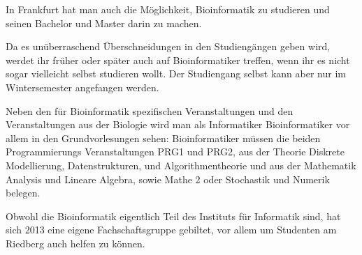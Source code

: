 In Frankfurt hat man auch die M\"oglichkeit, Bioinformatik zu studieren und seinen Bachelor und Master darin zu machen.

Da es un\"uberraschend \"Uberschneidungen in den Studieng\"angen geben wird, werdet ihr fr\"uher oder sp\"ater auch auf Bioinformatiker treffen, wenn ihr es nicht sogar vielleicht selbst studieren wollt.
Der Studiengang selbst kann aber nur im Wintersemester angefangen werden.

Neben den f\"ur Bioinformatik spezifischen Veranstaltungen und den Veranstaltungen aus der Biologie wird man 
als Informatiker Bioinformatiker vor allem in den Grundvorlesungen sehen:
Bioinformatiker m\"ussen die beiden Programmierungs Veranstaltungen PRG1 und
PRG2, aus der Theorie Diskrete Modellierung, Datenstrukturen, und
Algorithmentheorie und aus der Mathematik Analysis und Lineare Algebra, sowie
Mathe 2 oder Stochastik und Numerik belegen.

Obwohl die Bioinformatik eigentlich Teil des Instituts f\"ur Informatik sind,
hat sich 2013 eine eigene Fachschaftsgruppe gebiltet, vor allem um Studenten am
Riedberg auch helfen zu k\"onnen.
